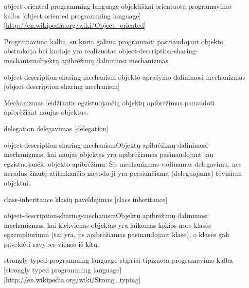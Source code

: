 \begin{glossary}
\begin{entry}
  \end{entry}
    
  \begin{entry}%
    {object-oriented-programming-language}%
    {objektiškai orientuota programavimo kalba}%
    [object oriented programming language]%
    [\url{http://en.wikipedia.org/wiki/Object_oriented}]

    Programavimo kalba, su kuria galima programuoti pasinaudojant
    objekto abstrakcija bei kurioje yra realizuotas 
    \gls{object-description-sharing-mechanism}{objektų apibrėžimų
    dalinimosi mechanizmas}.
    
  \end{entry}

  \begin{entry}%
    {object-description-sharing-mechanism}%
    {objekto aprašymo dalinimosi mechanizmas}%
    [object description sharing mechanism]

    Mechanizmas leidžiantis egzistuojančių objektų apibrėžimus panaudoti
    apibrėžiant naujus objektus.
    
  \end{entry}

  \begin{entry}%
    {delegation}%
    {delegavimas}%
    [delegation]

    \gls{object-description-sharing-mechanism}{Objektų apibrėžimų
    dalinimosi mechanizmas}, kai naujas objektas yra apibrėžiamas
    pasinaudojant jau egzistuojančio objekto apibrėžimu. Šis
    mechanizmas vadinamas delegavimu, nes neradus žinutę atitinkančio
    metodo ji yra persiunčiama (deleguojama) tėviniam objektui.
    
  \end{entry}

  \begin{entry}%
    {class-inheritance}%
    {klasių paveldėjimas}%
    [class inheritance]

    \gls{object-description-sharing-mechanism}{Objektų apibrėžimų
    dalinimosi mechanizmas}, kai kiekvienas objektas yra laikomas
    kokios nors klasės egzemplioriumi (tai yra, jis apibrėžiamas
    pasinaudojant klase), o klasės gali paveldėti savybes vienos
    iš kitų.
    
  \end{entry}

  \begin{entry}%
    {strongly-typed-programming-language}%
    {stipriai tipizuota programavimo kalba}%
    [strongly typed programming language]%
    [\url{http://en.wikipedia.org/wiki/Strong_typing}]


\end{entry}
\end{glossary}
